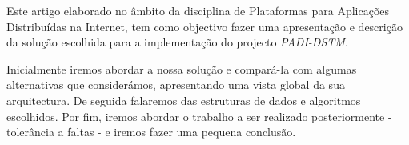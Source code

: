 Este artigo elaborado no âmbito da disciplina de Plataformas para Aplicações Distribuídas na Internet, tem como objectivo fazer uma apresentação e descrição da solução escolhida para a implementação do projecto \textit{PADI-DSTM}.

Inicialmente iremos abordar a nossa solução e compará-la com algumas alternativas que considerámos, apresentando uma vista global da sua arquitectura. De seguida falaremos das estruturas de dados e algoritmos escolhidos. Por fim, iremos abordar o trabalho a ser realizado posteriormente - tolerância a faltas - e iremos fazer uma pequena conclusão.